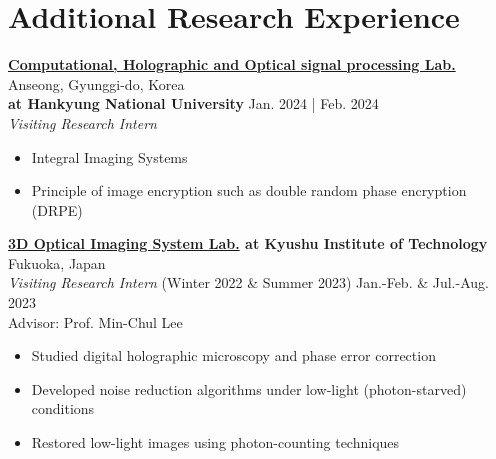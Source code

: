 \documentclass[a4paper,9pt]{extarticle}
\begin{document}
\section*{Additional Research Experience}

\noindent
\textbf{\href{https://3cholab.wordpress.com/정보/}{Computational, Holographic and Optical signal processing Lab.}} \hfill Anseong, Gyunggi-do, Korea\\ %
\textbf{at Hankyung National University} \hfill Jan. 2024 | Feb. 2024 \\
\textit{Visiting Research Intern} %
\begin{itemize}
    \item Integral Imaging Systems
    \item Principle of image encryption such as double random phase encryption (DRPE) \\
\end{itemize}

\noindent
\textbf{\href{https://leelab.csn.kyutech.ac.jp}{3D Optical Imaging System Lab.} at Kyushu Institute of Technology} \hfill Fukuoka, Japan\\ %
\textit{Visiting Research Intern} (Winter 2022 \& Summer 2023) \hfill Jan.-Feb. \& Jul.-Aug. 2023\\%
Advisor: Prof. Min-Chul Lee 
\begin{itemize}
    \item Studied digital holographic microscopy and phase error correction  
    \item Developed noise reduction algorithms under low-light (photon-starved) conditions  
    \item Restored low-light images using photon-counting techniques \\
\end{itemize}
\end{document}
